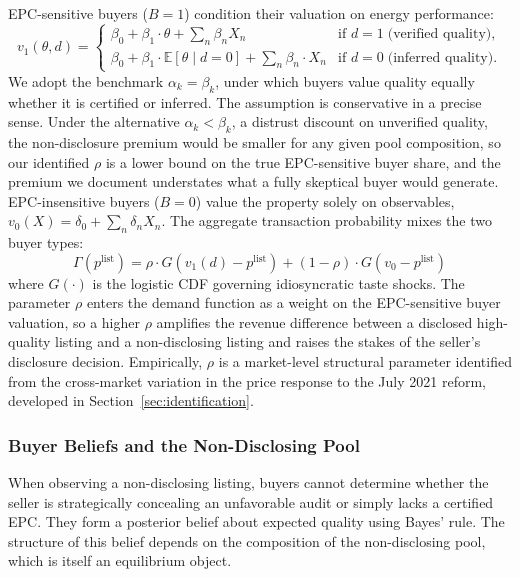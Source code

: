 EPC-sensitive buyers ($B=1$) condition their valuation on energy performance:
\begin{equation}
    v_1(\theta,d) = \begin{cases}
        \beta_0 + \beta_1\cdot\theta + \textstyle\sum_n\beta_n X_n & \text{if } d=1 \;\text{(verified quality)},\\
        \beta_0 + \beta_1\cdot\mathbb{E}[\theta\mid d{=}0] + \textstyle\sum_n\beta_n \cdot X_n & \text{if } d=0 \;\text{(inferred quality)}.
    \end{cases}
\end{equation}
We adopt the benchmark $\alpha_k=\beta_k$, under which buyers value quality equally whether it is certified or inferred. The assumption is conservative in a precise sense. Under the alternative $\alpha_k<\beta_k$, a distrust discount on unverified quality, the non-disclosure premium would be smaller for any given pool composition, so our identified $\rho$ is a lower bound on the true EPC-sensitive buyer share, and the premium we document understates what a fully skeptical buyer would generate. EPC-insensitive buyers ($B=0$) value the property solely on observables, $v_0(X)=\delta_0+\sum_n\delta_n X_n$. The aggregate transaction probability mixes the two buyer types:
\begin{equation}
    \Gamma(p^{\text{list}}) = \rho\cdot G\!\left(v_1(d)-p^{\text{list}}\right) + (1-\rho)\cdot G\!\left(v_0-p^{\text{list}}\right)
    \label{eq:demand}
\end{equation}
where $G(\cdot)$ is the logistic CDF governing idiosyncratic taste shocks. The parameter $\rho$ enters the demand function as a weight on the EPC-sensitive buyer valuation, so a higher $\rho$ amplifies the revenue difference between a disclosed high-quality listing and a non-disclosing listing and raises the stakes of the seller's disclosure decision. Empirically, $\rho$ is a market-level structural parameter identified from the cross-market variation in the price response to the July 2021 reform, developed in Section~\ref{sec:identification}.

\subsubsection{Buyer Beliefs and the Non-Disclosing Pool}

When observing a non-disclosing listing, buyers cannot determine whether the seller is strategically concealing an unfavorable audit or simply lacks a certified EPC. They form a posterior belief about expected quality using Bayes' rule. The structure of this belief depends on the composition of the non-disclosing pool, which is itself an equilibrium object.

